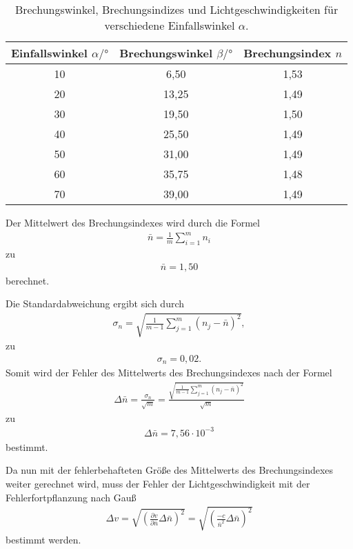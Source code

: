 \begin{table}
  \centering
  \caption{Brechungswinkel, Brechungsindizes und Lichtgeschwindigkeiten für verschiedene Einfallswinkel $\alpha$.}
  \label{tab:Brechung}
  \begin{tabular}{S S S}
  \toprule
  {Einfallswinkel $\alpha / \si{\degree}$} &{Brechungswinkel $\beta / \si{\degree}$} & {Brechungsindex $n$}\\
    & 6,50  & 1,53 \\
  20  & 13,25 & 1,49 \\
  30  & 19,50 & 1,50 \\
  40  & 25,50 & 1,49 \\
  50  & 31,00 & 1,49 \\
  60  & 35,75 & 1,48 \\
  70  & 39,00 & 1,49 \\
  \bottomrule
  \end{tabular}
\end{table}


Der Mittelwert des Brechungsindexes wird durch die Formel
\begin{align}
    \bar{n}=\frac{1}{m} \sum_{i=1}^m n_i
    \label{eqn:Mittelwert}
\end{align}
zu 
\begin{align*}
  \bar{n}=1,50
\end{align*}
berechnet.

Die Standardabweichung ergibt sich durch
\begin{align}
    \sigma_n=\sqrt{\frac{1}{m-1}\sum_{j=1}^m (n_j-\bar{n})^2},
    \label{eqn:Standardabweichung}
\end{align}
zu
\begin{align*}
  \sigma_n= 0,02.
\end{align*}
Somit wird der Fehler des Mittelwerts des Brechungsindexes nach der Formel
\begin{align}
    \Delta \bar{n}= \frac{\sigma_n}{\sqrt{m}} = \frac{\sqrt{\frac{1}{m-1}\sum_{j=1}^m (n_j-\bar{n})^2}}{\sqrt{m}}
    \label{eqn:Fehler}
\end{align}
zu 
\begin{align*}
  \Delta \bar{n}=7,56 \cdot 10^{-3}
\end{align*}
bestimmt.

Da nun mit der fehlerbehafteten Größe des Mittelwerts des Brechungsindexes weiter gerechnet wird, muss der Fehler der Lichtgeschwindigkeit mit der Fehlerfortpflanzung nach Gauß
\begin{align*}
  \Delta v= \sqrt{\left(\frac{\partial v}{\partial \bar{n}}\Delta \bar{n} \right)^{2}} =  \sqrt{\left(\frac{-c}{\bar{n}^2}\Delta \bar{n} \right)^{2}} \label{eqn:Gauß}
\end{align*}
bestimmt werden.

